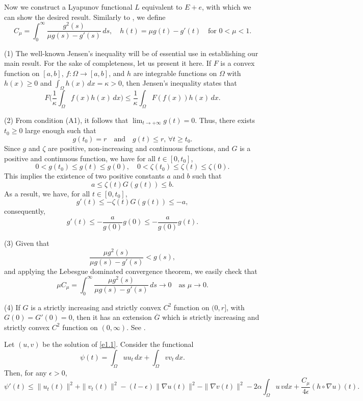 Now we construct a Lyapunov functional $L$ equivalent to $E+e$, with which we can
show the desired result.
Similarly to \cite{JKJT}, we define
\[
 C_\mu = \int_0^{\infty} \frac{g^2(s)}{\mu g(s) - g'(s)} \, ds, \quad
 h(t) = \mu g(t) - g'(t)\quad
 \text{for } 0<\mu <1.
\]

\begin{remark} \label{rmk6} \rm
(1) The well-known Jensen's inequality will be of essential use in establishing our
 main result. For the sake of completeness, let us present it here.
 If \( F \) is a convex function on \( [a, b] \), \( f : \Omega \to [a, b] \), and
 \( h \) are integrable functions on \( \Omega \) with
 \( h(x) \geq 0 \) and $\int_\Omega h(x)\,dx = \kappa > 0$,
then Jensen's inequality states that
\[
F\Big( \frac{1}{\kappa} \int_\Omega f(x) h(x)\,dx \Big)
\leq \frac{1}{\kappa} \int_\Omega F(f(x)) h(x)\,dx.
\]

(2) From condition (A1), it follows that $ \lim_{t \to +\infty} g(t) = 0$.
Thus, there exists \( t_0 \geq 0 \) large enough such that
\[
g(t_0) = r \quad \text{and} \quad g(t) \leq r, \, \forall t \geq t_0.
\]
Since $g$ and $\zeta$ are positive, non-increasing and continuous functions, and
$G$ is a positive and continuous function, we have for all \( t \in [0, t_0] \),
\[
0 < g(t_0) \leq g(t) \leq g(0), \quad 0 < \zeta(t_0) \leq \zeta(t) \leq \zeta(0).
\]
This implies the existence of two positive constants \( a \) and \( b \) such that
\[
a \leq \zeta(t) G(g(t)) \leq b.
\]
As a result, we have, for all \( t \in [0, t_0] \),
\[
g'(t) \leq -\zeta(t) G(g(t)) \leq -a,
\]
consequently,
\[
g'(t) \leq -\frac{a}{g(0)} g(0) \leq -\frac{a}{g(0)} g(t). \label{e4.7}
\]

(3) Given that
\[
\frac{\mu g^2(s)}{\mu g(s) - g'(s)} < g(s),
\]
and applying the Lebesgue dominated convergence theorem, we easily check that
\[
\mu C_\mu = \int_0^\infty \frac{\mu g^2(s)}{\mu g(s) - g'(s)} \, ds \to 0
\quad \text{as } \mu \to 0.
\]

(4) If $G$ is a strictly increasing and strictly convex $C^2$ function on $(0, r]$,
with $G(0) = G'(0) = 0$, then it has an extension $\overline{G}$ which is strictly
increasing and strictly convex $C^2$ function on $(0, \infty)$.
See \cite{MustafaMuhammadR}.
\end{remark}

\begin{lemma} \label{lem7}
Let $(u,v)$ be the solution of \eqref{e1.1}. Consider the functional
\[
 \psi(t) = \int_{\Omega} uu_t \, dx +\int_{\Omega} vv_t \, dx.
\]
Then, for any \(\epsilon > 0\),
\begin{equation}
 \psi '(t) \leq \| u_t(t) \|^2 +\| v_t(t) \|^2 - (l-\epsilon) \| \nabla u(t) \|^2 - \| \nabla v (t)\|^2 -2 \alpha \int_{\Omega} u \, v dx + \frac{ C_\mu }{4\epsilon} (h \circ \nabla u)(t).
 \label{e4.8}
\end{equation}
\end{lemma}

